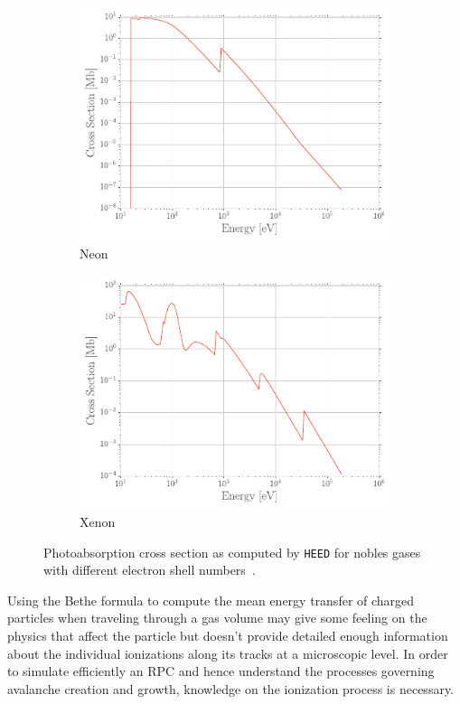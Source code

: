 \begin{figure}[H]
\begin{subfigure}{0.5\linewidth}
			\includegraphics[width = \linewidth]{fig/chapt3/HEED-Neon.pdf}
			\caption{\label{fig:PAIR:C} Neon}
		\end{subfigure}
		\begin{subfigure}{0.5\linewidth}
			\centering
			\includegraphics[width = \linewidth]{fig/chapt3/HEED-Xenon.pdf}
			\caption{\label{fig:PAIR:D} Xenon}
		\end{subfigure}
		\caption{\label{fig:PAIR} Photoabsorption cross section as computed by \texttt{HEED} for nobles gases with different electron shell numbers~\cite{VINCENT2017}.}
	\end{figure}
	
	Using the Bethe formula to compute the mean energy transfer of charged particles when traveling through a gas volume may give some feeling on the physics that affect the particle but doesn't provide detailed enough information about the individual ionizations along its tracks at a microscopic level. In order to simulate efficiently an RPC and hence understand the processes governing avalanche creation and growth, knowledge on the ionization process is necessary.
	

